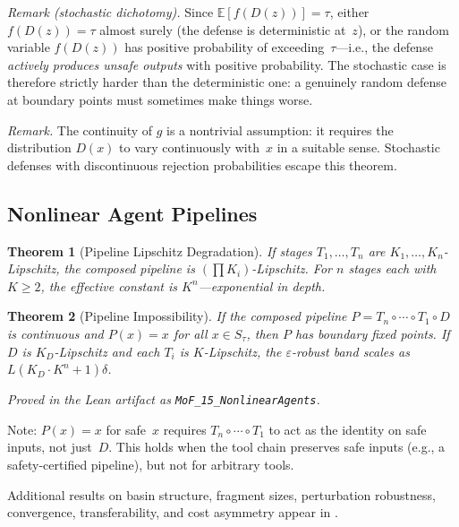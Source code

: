 \documentclass{article}
\newtheorem{theorem}{Theorem}[section]
\begin{document}
\noindent\textit{Remark (stochastic dichotomy).}
Since $\mathbb{E}[f(D(z))] = \tau$, either $f(D(z)) = \tau$ almost
surely (the defense is deterministic at~$z$), or the random variable
$f(D(z))$ has positive probability of exceeding~$\tau$---i.e., the
defense \emph{actively produces unsafe outputs} with positive
probability. The stochastic case is therefore strictly harder than
the deterministic one: a genuinely random defense at boundary points
must sometimes make things worse.

\noindent\textit{Remark.}
The continuity of $g$ is a nontrivial assumption: it requires the
distribution $D(x)$ to vary continuously with~$x$ in a suitable sense.
Stochastic defenses with discontinuous rejection probabilities escape
this theorem.

\subsection{Nonlinear Agent Pipelines}

\begin{theorem}[Pipeline Lipschitz Degradation]
\label{thm:pipeline}
If stages $T_1, \ldots, T_n$ are $K_1, \ldots, K_n$-Lipschitz, the
composed pipeline is $(\prod K_i)$-Lipschitz. For $n$ stages each with
$K \geq 2$, the effective constant is $K^n$---exponential in depth.
\end{theorem}

\begin{theorem}[Pipeline Impossibility]
\label{thm:pipeline-impossible}
If the composed pipeline $P = T_n \circ \cdots \circ T_1 \circ D$ is
continuous and $P(x) = x$ for all $x \in S_\tau$, then $P$ has
boundary fixed points. If $D$ is $K_D$-Lipschitz and each $T_i$ is
$K$-Lipschitz, the $\varepsilon$-robust band scales as
$L(K_D \cdot K^n + 1)\delta$.
\end{theorem}

\noindent\emph{Proved in the Lean artifact as \textup{\texttt{MoF\_15\_NonlinearAgents}}.}

Note: $P(x) = x$ for safe~$x$ requires $T_n \circ \cdots \circ T_1$
to act as the identity on safe inputs, not just~$D$. This holds when
the tool chain preserves safe inputs (e.g., a safety-certified
pipeline), but not for arbitrary tools.


Additional results on basin structure, fragment sizes, perturbation robustness, convergence, transferability, and cost asymmetry appear in .
\end{document}
